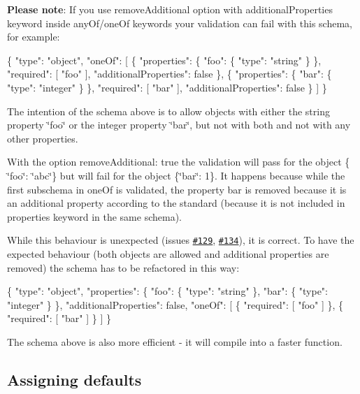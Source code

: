 {\bfseries Please note}\+: If you use {\ttfamily remove\+Additional} option with {\ttfamily additional\+Properties} keyword inside {\ttfamily any\+Of}/{\ttfamily one\+Of} keywords your validation can fail with this schema, for example\+:


\begin{DoxyCode}
\{
  "type": "object",
  "oneOf": [
    \{
      "properties": \{
        "foo": \{ "type": "string" \}
      \},
      "required": [ "foo" ],
      "additionalProperties": false
    \},
    \{
      "properties": \{
        "bar": \{ "type": "integer" \}
      \},
      "required": [ "bar" ],
      "additionalProperties": false
    \}
  ]
\}
\end{DoxyCode}


The intention of the schema above is to allow objects with either the string property \char`\"{}foo\char`\"{} or the integer property \char`\"{}bar\char`\"{}, but not with both and not with any other properties.

With the option {\ttfamily remove\+Additional\+: true} the validation will pass for the object {\ttfamily \{ \char`\"{}foo\char`\"{}\+: \char`\"{}abc\char`\"{}\}} but will fail for the object {\ttfamily \{\char`\"{}bar\char`\"{}\+: 1\}}. It happens because while the first subschema in {\ttfamily one\+Of} is validated, the property {\ttfamily bar} is removed because it is an additional property according to the standard (because it is not included in {\ttfamily properties} keyword in the same schema).

While this behaviour is unexpected (issues \href{https://github.com/epoberezkin/ajv/issues/129}{\tt \#129}, \href{https://github.com/epoberezkin/ajv/issues/134}{\tt \#134}), it is correct. To have the expected behaviour (both objects are allowed and additional properties are removed) the schema has to be refactored in this way\+:


\begin{DoxyCode}
\{
  "type": "object",
  "properties": \{
    "foo": \{ "type": "string" \},
    "bar": \{ "type": "integer" \}
  \},
  "additionalProperties": false,
  "oneOf": [
    \{ "required": [ "foo" ] \},
    \{ "required": [ "bar" ] \}
  ]
\}
\end{DoxyCode}


The schema above is also more efficient -\/ it will compile into a faster function.

\subsection*{Assigning defaults}


